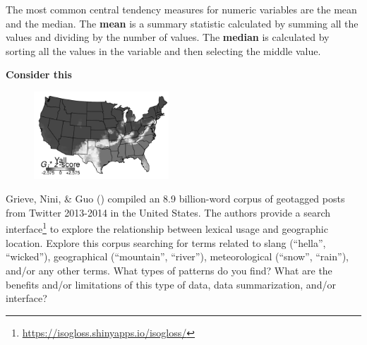 \documentclass[
  letterpaper,
  krantz1]{latex/krantz-mod}
\theoremstyle{definition}
\theoremstyle{definition}
\theoremstyle{remark}
\DeclareRobustCommand{\href}[2]{#2\footnote{\url{#1}}}
\begin{document}
The most common central tendency measures for numeric variables are the
mean and the median. The \textbf{mean} is a summary
statistic calculated by summing all the values and dividing by the
number of values. The \textbf{median} is calculated by
sorting all the values in the variable and then selecting the middle
value.

\begin{tcolorbox}[enhanced jigsaw, toprule=.15mm, breakable, colback=white, arc=.35mm, left=2mm, colframe=quarto-callout-color-frame, opacityback=0, bottomrule=.15mm, rightrule=.15mm, leftrule=.75mm]

\textbf{ Consider this}

\begin{figure}
  \centering
  \includegraphics[width=0.45\textwidth]{part_2/figures/data-word-mapper.png}
\end{figure}

Grieve, Nini, \& Guo () compiled an 8.9
billion-word corpus of geotagged posts from Twitter 2013-2014 in the
United States. The authors provide a
\href{https://isogloss.shinyapps.io/isogloss/}{search interface} to
explore the relationship between lexical usage and geographic location.
Explore this corpus searching for terms related to slang (``hella'',
``wicked''), geographical (``mountain'', ``river''), meteorological
(``snow'', ``rain''), and/or any other terms. What types of patterns do
you find? What are the benefits and/or limitations of this type of data,
data summarization, and/or interface?

\end{tcolorbox}
\end{document}
